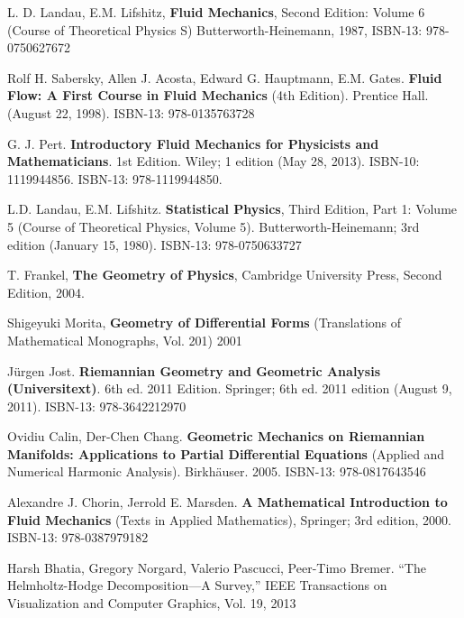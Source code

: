 \documentclass[twoside,landscape,10pt]{amsart}
\theoremstyle{plain}
\theoremstyle{definition}
\theoremstyle{remark}
\theoremstyle{remark}
\begin{document}
\begin{thebibliography}{9}

L. D. Landau, E.M. Lifshitz, \textbf{Fluid Mechanics}, Second Edition: Volume 6 (Course of Theoretical Physics S) Butterworth-Heinemann, 1987, ISBN-13: 978-0750627672

Rolf H. Sabersky, Allen J. Acosta, Edward G. Hauptmann, E.M. Gates.  \textbf{Fluid Flow: A First Course in Fluid Mechanics} (4th Edition).  Prentice Hall. (August 22, 1998).  ISBN-13: 978-0135763728

G. J. Pert. \textbf{Introductory Fluid Mechanics for Physicists and Mathematicians}. 1st Edition. Wiley; 1 edition (May 28, 2013). ISBN-10: 1119944856. ISBN-13: 978-1119944850. 


L.D. Landau, E.M. Lifshitz.  \textbf{Statistical Physics}, Third Edition, Part 1: Volume 5 (Course of Theoretical Physics, Volume 5). Butterworth-Heinemann; 3rd edition (January 15, 1980).  ISBN-13: 978-0750633727


T. Frankel,
\textbf{The Geometry of Physics}, 
Cambridge University Press, 
Second Edition,
2004.

Shigeyuki Morita, \textbf{Geometry of Differential Forms} (Translations of Mathematical Monographs, Vol. 201)  2001


J\"{u}rgen Jost. \textbf{Riemannian Geometry and Geometric Analysis (Universitext)}. 6th ed. 2011 Edition.  Springer; 6th ed. 2011 edition (August 9, 2011).  ISBN-13: 978-3642212970


Ovidiu Calin, Der-Chen Chang. \textbf{Geometric Mechanics on Riemannian Manifolds: Applications to Partial Differential Equations} (Applied and Numerical Harmonic Analysis).  Birkh\"{a}user. 2005. ISBN-13: 978-0817643546







Alexandre J. Chorin, Jerrold E. Marsden. \textbf{A Mathematical Introduction to Fluid Mechanics} (Texts in Applied Mathematics), Springer; 3rd edition, 2000. ISBN-13: 978-0387979182


Harsh Bhatia, Gregory Norgard, Valerio Pascucci, Peer-Timo Bremer. ``The Helmholtz-Hodge Decomposition—A Survey,'' IEEE Transactions on Visualization and Computer Graphics, Vol. 19,  2013



\end{thebibliography}
\end{document}
